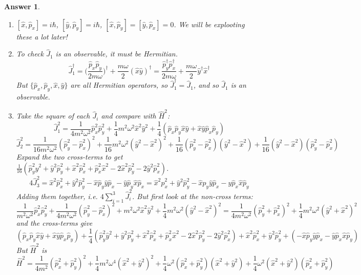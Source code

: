 \documentclass[a4paper]{article}
\newtheorem{ans}{Answer}[subsection]
\theoremstyle{new}
\begin{document}
\begin{ans}\leavevmode
\begin{enumerate}[label=(\roman*)]
\item $[\hat{x},\hat{p}_x]=i\hbar$, $[\hat{y},\hat{p}_y]=i\hbar$, $[\hat{x},\hat{p}_y]=[\hat{y},\hat{p}_x]=0$. We will be explooting these a lot later!
\item To check $\hat{J}_1$ is an observable, it must be Hermitian.
$$\hat{J}_1^\dag=\bigg(\frac{\hat{p}_x\hat{p}_y}{2m\omega}\bigg)^\dag+\frac{m\omega}{2}(\hat{x}\hat{y})^\dag=\frac{\hat{p}_y^\dag\hat{p}_x^\dag}{2m\omega}+\frac{m\omega}{2}\hat{y}^\dag\hat{x}^\dag$$
But $\{\hat{p}_x,\hat{p}_y,\hat{x},\hat{y}\}$ are all Hermitian operators, so $\hat{J}_1^\dag=\hat{J}_1$, and so $\hat{J}_1$ is an observable.
\item Take the square of each $\hat{J}_i$ and compare with $\hat{H}^2$:
$$\hat{J}_1^2=\frac{1}{4m^2\omega^2}\hat{p}_x^2\hat{p}_y^2+\frac{1}{4}m^2\omega^2\hat{x}^2\hat{y}^2+\frac{1}{4}(\hat{p}_x\hat{p}_y\hat{x}\hat{y}+\hat{x}\hat{y}\hat{p}_x\hat{p}_y)$$
$$\hat{J}_2^2=\frac{1}{16m^2\omega^2}(\hat{p}_y^2-\hat{p}_x^2)^2+\frac{1}{16}m^2\omega^2(\hat{y}^2-\hat{x}^2)^2+\frac{1}{16}(\hat{p}_y^2-\hat{p}_x^2)(\hat{y}^2-\hat{x}^2)+\frac{1}{16}(\hat{y}^2-\hat{x}^2)(\hat{p}_y^2-\hat{p}_x^2)$$
Expand the two cross-terms to get $\frac{1}{16}(\hat{p}_y^2\hat{y}^2+\hat{y}^2\hat{p}_y^2+\hat{x}^2\hat{p}_x^2+\hat{p}_x^2\hat{x}^2-2\hat{x}^2\hat{p}_y^2-2\hat{y}^2\hat{p}_x^2)$.
$$4\hat{J}_3^2=\hat{x}^2\hat{p}_x^2+\hat{y}^2\hat{p}_y^2-\hat{x}\hat{p}_y\hat{y}\hat{p}_x-\hat{y}\hat{p}_y\hat{x}\hat{p}_x=\hat{x}^2\hat{p}_x^2+\hat{y}^2\hat{p}_y^2-\hat{x}\hat{p}_y\hat{y}\hat{p}_x-\hat{y}\hat{p}_x\hat{x}\hat{p}_y$$
Adding them together, i.e. $4\sum_{i=1}^3\hat{J}_i^2$. But first look at the non-cross terms:
$$\frac{1}{m^2\omega^2}\hat{p}_x^2\hat{p}_y^2+\frac{1}{4m^2\omega^2}(\hat{p}_y^2-\hat{p}_x^2)^2+m^2\omega^2\hat{x}^2\hat{y}^2+\frac{1}{4}m^2\omega^2(\hat{y}^2-\hat{x}^2)^2=\frac{1}{4m^2\omega^2}(\hat{p}_y^2+\hat{p}_x^2)^2+\frac{1}{4}m^2\omega^2(\hat{y}^2+\hat{x}^2)^2$$
and the cross-terms give
\begin{equation}
    (\hat{p}_x\hat{p}_y\hat{x}\hat{y}+\hat{x}\hat{y}\hat{p}_x\hat{p}_y)+\frac{1}{4}(\hat{p}_y^2\hat{y}^2+\hat{y}^2\hat{p}_y^2+\hat{x}^2\hat{p}_x^2+\hat{p}_x^2\hat{x}^2-2\hat{x}^2\hat{p}_y^2-2\hat{y}^2\hat{p}_x^2)+\hat{x}^2\hat{p}_x^2+\hat{y}^2\hat{p}_y^2+(-\hat{x}\hat{p}_y\hat{y}\hat{p}_x-\hat{y}\hat{p}_x\hat{x}\hat{p}_y)\tag{*}
\end{equation}
But $\hat{H}^2$ is
$$\hat{H}^2=\frac{1}{4m^2}(\hat{p}_x^2+\hat{p}_y^2)^2+\frac{1}{4}m^2\omega^4(\hat{x}^2+\hat{y}^2)^2+\frac{1}{4}\omega^2(\hat{p}_x^2+\hat{p}_y^2)(\hat{x}^2+\hat{y}^2)+\frac{1}{4}\omega^2(\hat{x}^2+\hat{y}^2)(\hat{p}_x^2+\hat{p}_y^2)$$

\end{enumerate}
\end{ans}
\end{document}
